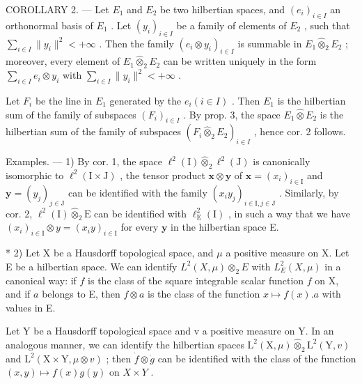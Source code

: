 COROLLARY 2. --- Let \(E_{1}\) and \(E_{2}\) be two hilbertian spaces, and \((e_{i})_{i\in I}\) an orthonormal basis of \(E_{1}\) . Let \((y_{i})_{i\in I}\) be a family of elements of \(E_{2}\) , such that \(\sum_{i\in I}\|y_{i}\|^{2}<+\infty\) . Then the family \((e_{i}\otimes y_{i})_{i\in I}\) is summable in \(E_{1}\hat{\otimes}_{2}E_{2}\) ; moreover, every element of \(E_{1}\hat{\otimes}_{2}E_{2}\) can be written uniquely in the form \(\sum_{i\in I}e_{i}\otimes y_{i}\) with \(\sum_{i\in I}\|y_{i}\|^{2}<+\infty\) .

Let \(F_{i}\) be the line in \(E_{1}\) generated by the \(e_{i} (i \in I)\) . Then \(E_{1}\) is the hilbertian sum of the family of subspaces \((F_{i})_{i \in I}\) . By prop. 3, the space \(E_{1} \hat{\otimes} E_{2}\) is the hilbertian sum of the family of subspaces \((F_{i} \hat{\otimes}_{2} E_{2})_{i \in I}\) , hence cor. 2 follows.

Examples. --- 1) By cor. 1, the space \(\ell^2 (\mathrm{I})\hat{\otimes}_2\ell^2 (\mathrm{J})\) is canonically isomorphic to \(\ell^2 (\mathrm{I}\times \mathrm{J})\) , the tensor product \(\mathbf{x}\otimes \mathbf{y}\) of \(\mathbf{x} = (x_i)_{i\in \mathrm{I}}\) and \(\mathbf{y} = (y_j)_{j\in \mathrm{J}}\) can be identified with the family \((x_iy_j)_{i\in \mathrm{I},j\in \mathrm{J}}\) . Similarly, by cor. 2, \(\ell^2 (\mathrm{I})\hat{\otimes}_2\mathrm{E}\) can be identified with \(\ell_{\mathrm{E}}^{2}(\mathrm{I})\) , in such a way that we have \((x_{i})_{i\in \mathrm{I}}\otimes y = (x_{i}y)_{i\in \mathrm{I}}\) for every \(\mathbf{y}\) in the hilbertian space E.

* 2) Let X be a Hausdorff topological space, and \(\mu\) a positive measure on X. Let E be a hilbertian space. We can identify \(L^2(X, \mu) \otimes_2 E\) with \(L_E^2(X, \mu)\) in a canonical way: if \(f\) is the class of the square integrable scalar function \(f\) on X, and if \(a\) belongs to E, then \(f \otimes a\) is the class of the function \(x \mapsto f(x).a\) with values in E.

Let Y be a Hausdorff topological space and v a positive measure on Y. In an analogous manner, we can identify the hilbertian spaces \(\mathrm{L}^{2}(\mathrm{X},\mu)\hat{\otimes}_{2}\mathrm{L}^{2}(\mathrm{Y},v)\) and \(\mathrm{L}^{2}(\mathrm{X}\times\mathrm{Y},\mu\otimes v)\) ; then \(\dot{f}\otimes\dot{g}\) can be identified with the class of the function \((x,y)\mapsto f(x)g(y)\) on \(X\times Y\) .

